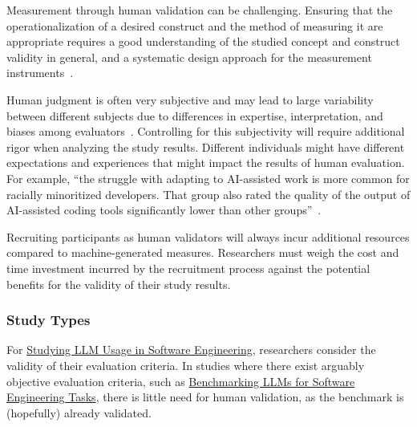 Measurement through human validation can be challenging.
Ensuring that the operationalization of a desired construct and the method of measuring it are appropriate requires a good understanding of the studied concept and construct validity in general, and a systematic design approach for the measurement instruments~\cite{DBLP:journals/tse/SjobergB23}.

Human judgment is often very subjective and may lead to large variability between different subjects due to differences in expertise, interpretation, and biases among evaluators~\cite{DBLP:journals/pacmhci/McDonaldSF19}.
Controlling for this subjectivity will require additional rigor when analyzing the study results.
Different individuals might have different expectations and experiences that might impact the results of human evaluation. For example, \enquote{the struggle with adapting to AI-assisted work is more common for racially minoritized developers. That group also rated the quality of the output of AI-assisted coding tools significantly lower than other groups}~\cite{hicks_lee_foster-marks_2025}.

Recruiting participants as human validators will always incur additional resources compared to machine-generated measures.
Researchers must weigh the cost and time investment incurred by the recruitment process against the potential benefits for the validity of their study results.

\subsubsection{Study Types}


For \href{/study-types/#studying-llm-usage-in-software-engineering}{Studying LLM Usage in Software Engineering}, researchers \should consider the validity of their evaluation criteria.
In studies where there exist arguably objective evaluation criteria, such as \href{/study-types/#benchmarking-llms-for-software-engineering-tasks}{Benchmarking LLMs for Software Engineering Tasks}, there is little need for human validation, as the benchmark is (hopefully) already validated.


